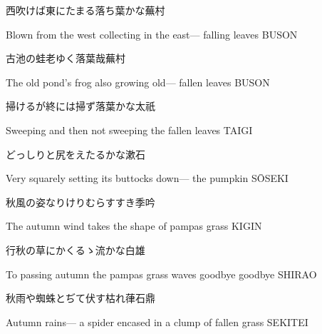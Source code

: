 \begin{haiku}
    {\FH 西吹けば東にたまる落ち葉かな}\hfill{\FH 蕪村}

    \vin{} Blown from the west
    \vin{} \vin{} collecting in the east---
    \vin{} \vin{} \vin{} falling leaves \hspace{\fill} BUSON
\end{haiku}

\begin{haiku}
    {\FH 古池の蛙老ゆく落葉哉}\hfill{\FH 蕪村}

    \vin{} The old pond's
    \vin{} \vin{} frog also growing old---
    \vin{} \vin{} \vin{} fallen leaves \hspace{\fill} BUSON
\end{haiku}

\begin{haiku}
    {\FH 掃けるが終には掃ず落葉かな}\hfill{\FH 太祇}

    \vin{} Sweeping
    \vin{} \vin{} and then not sweeping
    \vin{} \vin{} \vin{} the fallen leaves \hspace{\fill} TAIGI
\end{haiku}

\begin{haiku}
    {\FH どっしりと尻をえたるかな}\hfill{\FH 漱石}

    \vin{} Very squarely
    \vin{} \vin{} setting its buttocks down---
    \vin{} \vin{} \vin{} the pumpkin \hspace{\fill} S\={O}SEKI
\end{haiku}

\begin{haiku}
    {\FH 秋風の姿なりけりむらすすき}\hfill{\FH 季吟}

    \vin{} The autumn wind
    \vin{} \vin{} takes the shape
    \vin{} \vin{} \vin{} of pampas grass \hspace{\fill} KIGIN
\end{haiku}

\begin{haiku}
    {\FH 行秋の草にかくるゝ流かな}\hfill{\FH 白雄}

    \vin{} To passing autumn
    \vin{} \vin{} the pampas grass waves
    \vin{} \vin{} \vin{} goodbye goodbye \hspace{\fill} SHIRAO
\end{haiku}

\begin{haiku}
    {\FH 秋雨や蜘蛛とぢて伏す枯れ葎}\hfill{\FH 石鼎}

    \vin{} Autumn rains---
    \vin{} \vin{} a spider encased in
    \vin{} \vin{} \vin{} a clump of fallen grass \hspace{\fill} SEKITEI
\end{haiku}

